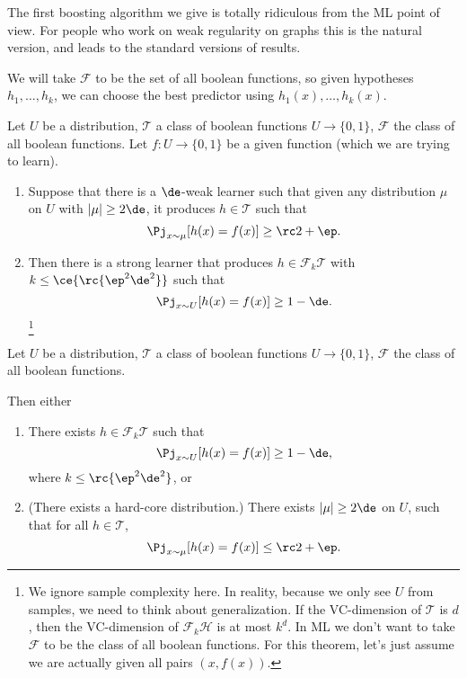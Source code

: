
The first boosting algorithm we give is totally ridiculous from the ML point of view. For people who work on weak regularity on graphs this is the natural version, and leads to the standard versions of results.

We will take $\mathcal F$ to be the set of all boolean functions, so given hypotheses $h_1,\ldots, h_k$, we can choose the best predictor using $h_1(x),\ldots, h_k(x)$.

\begin{thm}\label{thm:boosting}
Let $U$ be a distribution, $\mathcal T$ a class of boolean functions $U\to \{0,1\}$,  $\mathcal F$ the class of all boolean functions. 
Let $f:U\to \{0,1\}$ be a given function (which we are trying to learn).

\begin{enumerate}
\item
Suppose that there is a $\de$-weak learner such that given any distribution $\mu$ on $U$ with $|\mu|\ge 2\de$, it produces $h\in \mathcal T$ such that 
$$
\Pj_{x\sim \mu} [h(x) = f(x)] \ge \rc 2+ \ep.
$$
\item
Then there is a strong learner that produces $h\in \mathcal F_k\mathcal T$ with $k\le\ce{\rc{\ep^2\de^2}}$ such that 
$$
\Pj_{x\sim U} [h(x) = f(x)]\ge 1-\de.
$$
\footnote{
We ignore sample complexity here. In reality, because we only see $U$ from samples, we need to think about generalization. If the VC-dimension of $\mathcal T$ is $d$, then the VC-dimension of $\mathcal F_k\mathcal H$ is at most $k^d$. In ML we don't want to take $\mathcal F$ to be the class of all boolean functions. For this theorem, let's just assume we are actually given all pairs $(x,f(x))$.
}
\end{enumerate}
\end{thm}

\begin{thm}
\label{thm:hardcore}
Let $U$ be a distribution, $\mathcal T$ a class of boolean functions $U\to \{0,1\}$, $\mathcal F$ the class of all boolean functions.

Then either
\begin{enumerate}
\item %
There exists $h\in \mathcal F_k \mathcal T$ such that 
$$
\Pj_{x\sim U} [h(x)=f(x)] \ge 1-\de,
$$
where $k\le\rc{\ep^2\de^2}$,
or
\item (There exists a hard-core distribution.)
There exists $|\mu|\ge 2\de$ on $U$, such that for all $h\in \mathcal T$, 
$$
\Pj_{x\sim \mu}[h(x) = f(x)] \le \rc 2+\ep.
$$
\end{enumerate}
\end{thm}

